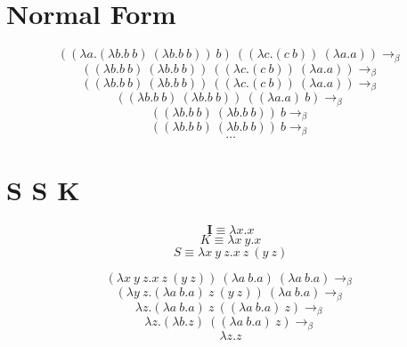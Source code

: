 \documentclass{article}
\begin{document}
\section{Normal Form}
\large{$$((\lambda a.(\lambda b.b\ b)\ (\lambda b.b\ b))\ b)\ ((\lambda c.(c\ b))\ (\lambda a.a))\rightarrow_\beta$$}
\large{$$((\lambda b.b\ b)\ (\lambda b.b\ b))\ ((\lambda c.(c\ b))\ (\lambda a.a))\rightarrow_\beta$$}
\large{$$((\lambda b.b\ b)\ (\lambda b.b\ b))\ ((\lambda c.(c\ b))\ (\lambda a.a))\rightarrow_\beta$$}
\large{$$((\lambda b.b\ b)\ (\lambda b.b\ b))\ ((\lambda a.a)\ b)\rightarrow_\beta$$}
\large{$$((\lambda b.b\ b)\ (\lambda b.b\ b))\ b\rightarrow_\beta$$}
\large{$$((\lambda b.b\ b)\ (\lambda b.b\ b))\ b\rightarrow_\beta$$}
$$\hdots$$

\section{S S K}
$$\textbf{I} \equiv \lambda x.x$$
$$K \equiv \lambda x\ y.x$$
$$S \equiv \lambda x\ y\ z. x\ z\ (y\ z)$$

\large{$$(\lambda x\ y\ z. x\ z\ (y\ z))\ (\lambda a\ b.a)\ (\lambda a\ b.a)\rightarrow_\beta$$}
\large{$$(\lambda y\ z. (\lambda a\ b.a)\ z\ (y\ z))\ (\lambda a\ b.a)\rightarrow_\beta$$}
\large{$$\lambda z. (\lambda a\ b.a)\ z\ ((\lambda a\ b.a)\ z)\rightarrow_\beta$$}
\large{$$\lambda z. (\lambda b.z)\ ((\lambda a\ b.a)\ z)\rightarrow_\beta$$}
\large{$$\lambda z. z$$}
\end{document}
